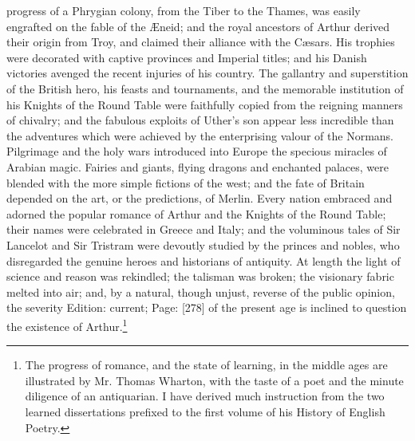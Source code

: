 progress of a Phrygian colony, from the Tiber to the Thames, was easily engrafted on the fable of the Æneid; and the royal ancestors of Arthur derived their origin from Troy, and claimed their alliance with the Cæsars. His trophies were decorated with captive provinces and Imperial titles; and his Danish victories avenged the recent injuries of his country. The gallantry and superstition of the British hero, his feasts and tournaments, and the memorable institution of his Knights of the Round Table were faithfully copied from the reigning manners of chivalry; and the fabulous exploits of Uther\texthebrew{}’s son appear less incredible than the adventures which were achieved by the enterprising valour of the Normans. Pilgrimage and the holy wars introduced into Europe the specious miracles of Arabian magic. Fairies and giants, flying dragons and enchanted palaces, were blended with the more simple fictions of the west; and the fate of Britain depended on the art, or the predictions, of Merlin. Every nation embraced and adorned the popular romance of Arthur and the Knights of the Round Table; their names were celebrated in Greece and Italy; and the voluminous tales of Sir Lancelot and Sir Tristram were devoutly studied by the princes and nobles, who disregarded the genuine heroes and historians of antiquity. At length the light of science and reason was rekindled; the talisman was broken; the visionary fabric melted into air; and, by a natural, though unjust, reverse of the public opinion, the severity Edition: current; Page: [278] of the present age is inclined to question the existence of Arthur.\footnote{The progress of romance, and the state of learning, in the middle ages are illustrated by Mr. Thomas Wharton, with the taste of a poet and the minute diligence of an antiquarian. I have derived much instruction from the two learned dissertations prefixed to the first volume of his History of English Poetry.}


